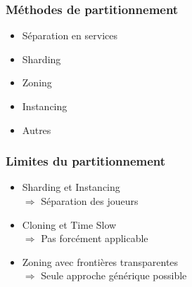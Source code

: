 \documentclass{beamer}
\begin{document}
\begin{frame}
  \frametitle{Méthodes de partitionnement}
  \begin{itemize}
    \item{Séparation en services}
    \item{Sharding\hspace{1cm}}
    \item{Zoning\hspace{1cm}}
    \item{Instancing}
    \item{Autres}
  \end{itemize}
\end{frame}

\begin{frame}
  \frametitle{Limites du partitionnement}
  \begin{itemize}
    \item{Sharding et Instancing
      \\[1mm]\hspace{1cm}$\Rightarrow$ Séparation des joueurs\vspace{5mm}}
    \item{Cloning et Time Slow
      \\[1mm]\hspace{1cm}$\Rightarrow$ Pas forcément applicable\vspace{5mm}}
    \item{Zoning avec frontières transparentes
      \\[1mm]\hspace{1cm}$\Rightarrow$ Seule approche générique possible}
  \end{itemize}
\end{frame}
\end{document}

